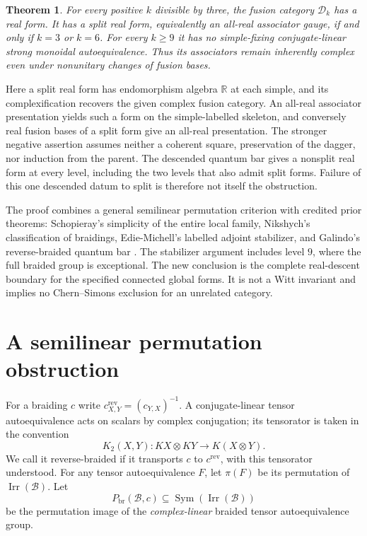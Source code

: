 \documentclass[11pt]{amsart}
\newtheorem{theorem}{Theorem}[section]
\theoremstyle{remark}
\newcommand{\R}{\mathbb R}
\newcommand{\B}{\mathcal B}
\newcommand{\D}{\mathcal D}
\newcommand{\Irr}{\operatorname{Irr}}
\newcommand{\rev}{\mathrm{rev}}
\newcommand{\Br}{\mathrm{br}}
\begin{document}
\begin{theorem}\label{thm:main}
For every positive $k$ divisible by three, the fusion category $\D_k$ has
a real form. It has a split real form, equivalently an all-real
associator gauge, if and only if $k=3$ or $k=6$.
For every $k\ge9$ it has no simple-fixing conjugate-linear strong
monoidal autoequivalence. Thus its associators remain inherently complex
even under nonunitary changes of fusion bases.
\end{theorem}

Here a split real form has endomorphism algebra $\R$ at each simple,
and its complexification recovers the given complex fusion category.
An all-real associator presentation yields such a form on the
simple-labelled skeleton, and conversely real fusion bases of a split
form give an all-real presentation. The stronger negative assertion
assumes neither a coherent square, preservation of the dagger, nor
induction from the parent. The descended quantum bar gives a nonsplit
real form at every level, including the two levels that also admit split
forms. Failure of this one descended datum to split is therefore not
itself the obstruction.

The proof combines a general semilinear permutation criterion with
credited prior theorems: Schopieray's simplicity of the entire local
family, Nikshych's classification of braidings, Edie-Michell's labelled
adjoint stabilizer, and Galindo's reverse-braided quantum bar
\cite{Schopieray,Nikshych,Edie,Galindo}. The stabilizer argument includes
level $9$, where the full braided group is exceptional. The new
conclusion is the complete real-descent boundary for the specified
connected global forms. It is not a Witt invariant and implies no
Chern--Simons exclusion for an unrelated category.

\section{A semilinear permutation obstruction}\label{sec:criterion}

For a braiding $c$ write
$c^{\rev}_{X,Y}=(c_{Y,X})^{-1}$.
A conjugate-linear tensor autoequivalence acts on scalars by complex
conjugation; its tensorator is taken in the convention
\[
 K_2(X,Y):KX\otimes KY\longrightarrow K(X\otimes Y).
\]
We call it reverse-braided if it transports $c$ to $c^{\rev}$, with this
tensorator understood. For any tensor autoequivalence $F$, let $\pi(F)$
be its permutation of $\Irr(\B)$. Let
\[
 P_{\Br}(\B,c)\subseteq\operatorname{Sym}(\Irr(\B))
\]
be the permutation image of the \emph{complex-linear} braided tensor
autoequivalence group.
\end{document}
